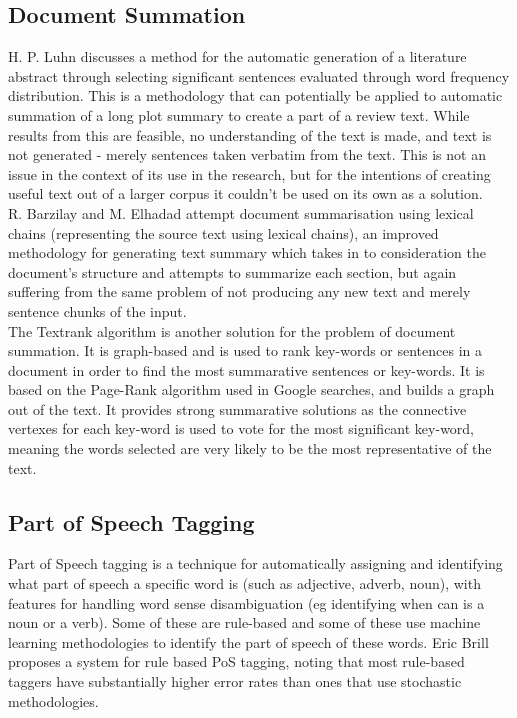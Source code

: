 \subsection{Document Summation}
H. P. Luhn discusses a method for the automatic generation of a literature abstract through selecting significant sentences evaluated through word frequency distribution. This is a methodology that can potentially be applied to automatic summation of a long plot summary to create a part of a review text. While results from this are feasible, no understanding of the text is made, and text is not generated - merely sentences taken verbatim from the text. This is not an issue in the context of its use in the research, but for the intentions of creating useful text out of a larger corpus it couldn't be used on its own as a solution.\\
R. Barzilay and M. Elhadad attempt document summarisation using lexical chains (representing the source text using lexical chains), an improved methodology for generating text summary which takes in to consideration the document's structure and attempts to summarize each section, but again suffering from the same problem of not producing any new text and merely sentence chunks of the input.\\ %

%
The Textrank algorithm is another solution for the problem of document summation. It is graph-based and is used to rank key-words or sentences in a document in order to find the most summarative sentences or key-words. It is based on the Page-Rank algorithm used in Google searches, and builds a graph out of the text. It provides strong summarative solutions as the connective vertexes for each key-word is used to vote for the most significant key-word, meaning the words selected are very likely to be the most representative of the text. 

\subsection{Part of Speech Tagging}
Part of Speech tagging is a technique for automatically assigning and identifying what part of speech a specific word is (such as adjective, adverb, noun), with features for handling word sense disambiguation (eg identifying when can is a noun or a verb). Some of these are rule-based and some of these use machine learning methodologies to identify the part of speech of these words.
Eric Brill proposes a system for rule based PoS tagging, noting that most rule-based taggers have substantially higher error rates than ones that use stochastic methodologies.

